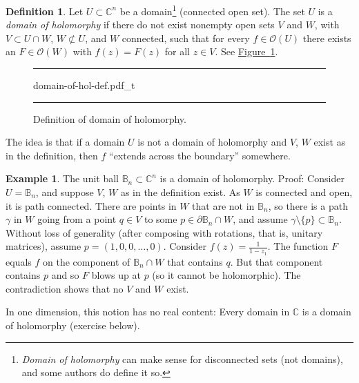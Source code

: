 \documentclass[12pt,openany]{book}
\newcommand{\C}{{\mathbb{C}}}
\newcommand{\bB}{{\mathbb{B}}}
\newcommand{\sO}{{\mathscr{O}}}
\newcommand{\myindex}[1]{#1\index{#1}}
\theoremstyle{plain}
\theoremstyle{remark}
\theoremstyle{definition}
\newtheorem{defn}[thm]{Definition}
\newenvironment{myfig}{%
\begin{figure}[h!t]
\noindent\rule{\textwidth}{0.5pt}\vspace{12pt}\par\centering}%
{\par\noindent\rule{\textwidth}{0.5pt}
\end{figure}}
\theoremstyle{exercise}
\theoremstyle{example}
\newtheorem{example}[thm]{Example}
\newcommand{\figureref}[1]{\hyperref[#1]{Figure~\ref*{#1}}}
\begin{document}
\begin{defn} \label{defn:domainofhol}
Let $U \subset \C^n$ be a domain\footnote{\emph{Domain of
holomorphy} can make sense for disconnected sets (not domains), and some authors
do define it so.}
(connected open set).  The set $U$ is
a \emph{\myindex{domain of holomorphy}} if there do not exist
nonempty open sets
$V$ and $W$, with $V \subset U \cap W$, $W \not\subset U$, and $W$
connected, such that for every $f \in \sO(U)$ there exists an $F \in
\sO(W)$ with $f(z) = F(z)$ for all $z \in V$.  See
\figureref{fig:domain-of-hol-def}.
\end{defn}

\begin{myfig}
{domain-of-hol-def.pdf_t}
\caption{Definition of domain of holomorphy.\label{fig:domain-of-hol-def}}
\end{myfig}

The idea is that if a domain $U$
is not a domain of holomorphy and $V$, $W$ exist as in the
definition, then $f$ ``extends across the boundary'' somewhere.

\begin{example}
The unit ball $\bB_n \subset \C^n$ is a domain of holomorphy.  Proof:
Consider $U=\bB_n$, and suppose $V$, $W$ as in the definition exist.
As $W$ is connected and open, it is path connected.  There are
points in $W$ that are not in $\bB_n$, so there
is a path $\gamma$ in $W$ going
from a point $q \in V$ to some $p \in \partial \bB_n \cap W$,
and assume $\gamma \setminus \{ p \} \subset \bB_n$.
Without loss of generality (after composing with
rotations, that is, unitary matrices), assume $p =
(1,0,0,\ldots,0)$.  Consider $f(z) = \frac{1}{1-z_1}$.
The function $F$ equals $f$ on the component of
$\bB_n \cap W$ that contains $q$.  But that component contains $p$ and
so $F$ blows up at $p$ (so it cannot be holomorphic).
The contradiction shows that no $V$ and $W$ exist.
\end{example}

In one dimension, this notion has no real content:
Every domain in $\C$ is a domain
of holomorphy (exercise below).
\end{document}
